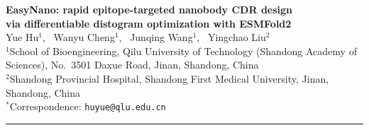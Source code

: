 \documentclass[11pt,a4paper]{article}
\begin{document}
\linenumbers

\begin{center}
{\LARGE\bfseries EasyNano: rapid epitope-targeted nanobody CDR design\\[4pt]via differentiable distogram optimization with ESMFold2}\\[16pt]

{\large Yue Hu$^{1}$, \ Wanyu Cheng$^{1}$, \ Junqing Wang$^{1}$, \ Yingchao Liu$^{2}$}\\[10pt]

{\normalsize
$^{1}$School of Bioengineering, Qilu University of Technology (Shandong Academy of Sciences), No.\ 3501 Daxue Road, Jinan, Shandong, China\\
$^{2}$Shandong Provincial Hospital, Shandong First Medical University, Jinan, Shandong, China\\[6pt]
$^{\ast}$Correspondence: \texttt{huyue@qlu.edu.cn}
}
\end{center}

\vspace{8pt}
\begin{center}
\rule{0.5\textwidth}{0.5pt}
\end{center}
\vspace{8pt}
\end{document}
